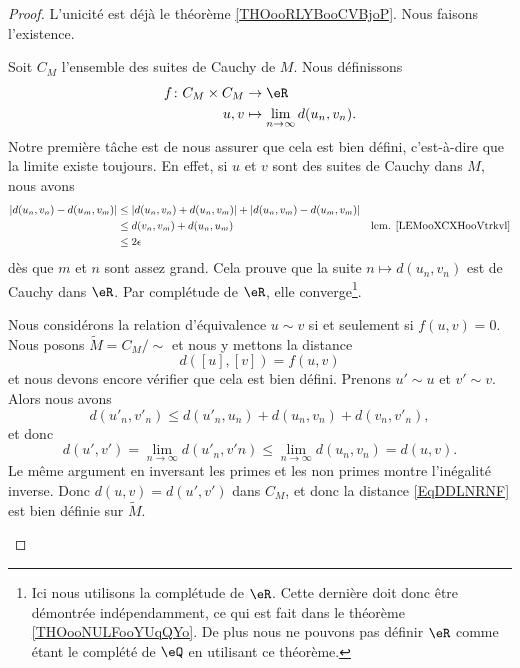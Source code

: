 \begin{proof}
	L'unicité est déjà le théorème \ref{THOooRLYBooCVBjoP}. Nous faisons l'existence.
	\begin{subproof}
		\spitem[Existence]

		Soit \( C_M\) l'ensemble des suites de Cauchy de \( M\). Nous définissons
		\begin{equation}
			\begin{aligned}
				f\colon C_M\times C_M & \to \eR                                \\
				u,v                   & \mapsto \lim_{n\to \infty} d(u_n,v_n).
			\end{aligned}
		\end{equation}
		Notre première tâche est de nous assurer que cela est bien défini, c'est-à-dire que la limite existe toujours. En effet, si \( u\) et \( v\) sont des suites de Cauchy dans \( M\), nous avons
		\begin{subequations}
			\begin{align}
				\left| d(u_n,v_n)-d(u_m,v_m) \right| & \leq | d(u_n,v_n)+d(u_n,v_m) |+| d(u_n,v_m)-d(u_m,v_m) |                                       \\
				                                     & \leq d(v_n,v_m)+d(u_n,u_m)                               & \text{lem. \ref{LEMooXCXHooVtrkvl}} \\
				                                     & \leq 2\epsilon
			\end{align}
		\end{subequations}
		dès que \( m\) et \( n\) sont assez grand. Cela prouve que la suite \( n\mapsto d(u_n,v_n)\) est de Cauchy dans \( \eR\). Par complétude de \( \eR\), elle converge\footnote{Ici nous utilisons la complétude de \( \eR\). Cette dernière doit donc être démontrée indépendamment, ce qui est fait dans le théorème \ref{THOooNULFooYUqQYo}. De plus nous ne pouvons pas définir \( \eR\) comme étant le complété de \( \eQ\) en utilisant ce théorème.}.

		Nous considérons la relation d'équivalence \( u\sim v\) si et seulement si \( f(u,v)=0\). Nous posons \( \tilde M=C_M/\sim\) et nous y mettons la distance
		\begin{equation}    \label{EqDDLNRNF}
			d( [u],[v]  )=f(u,v)
		\end{equation}
		et nous devons encore vérifier que cela est bien défini. Prenons \( u'\sim u\) et \( v'\sim v\). Alors nous avons
		\begin{equation}
			d(u'_n,v'_n)\leq d(u'_n,u_n)+d(u_n,v_n)+d(v_n,v'_n),
		\end{equation}
		et donc
		\begin{equation}
			d(u',v')=\lim_{n\to \infty} d(u'_n,v'n)\leq \lim_{n\to \infty} d(u_n,v_n)=d(u,v).
		\end{equation}
		Le même argument en inversant les primes et les non primes montre l'inégalité inverse. Donc \( d(u,v)=d(u',v')\) dans \( C_M\), et donc la distance \eqref{EqDDLNRNF} est bien définie sur \( \tilde M\).


\end{subproof}
\end{proof}
